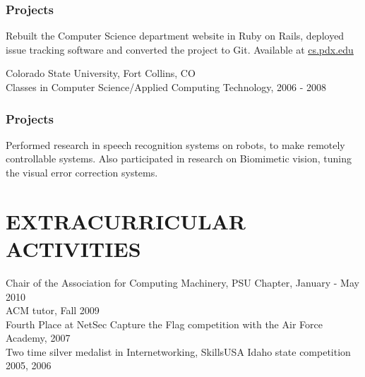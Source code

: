 \documentclass{res}
\begin{document}
\begin{resume}
  \subsubsection{Projects}
  \vspace{-0.2in}	
    Rebuilt the Computer Science department website in Ruby on Rails, deployed
    issue tracking software and converted the project to Git. Available at \url{cs.pdx.edu}

  \vspace{-0.2in}	
  Colorado State University, Fort Collins, CO \\
  Classes in Computer Science/Applied Computing Technology, 2006 - 2008 \\
  \vspace{-0.5in}	
  \subsubsection{Projects}
  \vspace{-0.2in}	
    Performed research in speech recognition systems on robots, to make
    remotely controllable systems. Also participated in research on Biomimetic
    vision, tuning the visual error correction systems.

\vspace{-0.1in}	
\section{EXTRACURRICULAR ACTIVITIES}          
    Chair of the Association for Computing Machinery, PSU Chapter, January - May 2010 \\
    ACM tutor, Fall 2009 \\
    Fourth Place at NetSec Capture the Flag competition with the Air Force Academy, 2007 \\
    Two time silver medalist in Internetworking, SkillsUSA Idaho state competition 2005, 2006 \\
 
\end{resume}
\end{document}
